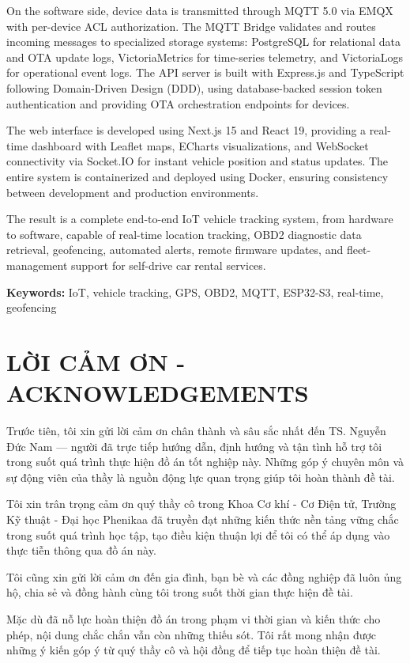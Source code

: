 \documentclass[a4paper]{extarticle}
\newcommand{\majorheading}[1]{%
  \clearpage
  \phantomsection
  \section*{#1}%
  \addcontentsline{toc}{section}{#1}%
}
\begin{document}
On the software side, device data is transmitted through MQTT 5.0 via
EMQX with per-device ACL authorization. The MQTT Bridge validates and
routes incoming messages to specialized storage systems: PostgreSQL for
relational data and OTA update logs, VictoriaMetrics for time-series
telemetry, and VictoriaLogs for operational event logs. The API server
is built with Express.js and TypeScript following Domain-Driven Design
(DDD), using database-backed session token authentication and providing
OTA orchestration endpoints for devices.

The web interface is developed using Next.js 15 and React 19, providing
a real-time dashboard with Leaflet maps, ECharts visualizations, and
WebSocket connectivity via Socket.IO for instant vehicle position and
status updates. The entire system is containerized and deployed using
Docker, ensuring consistency between development and production
environments.

The result is a complete end-to-end IoT vehicle tracking system, from
hardware to software, capable of real-time location tracking, OBD2
diagnostic data retrieval, geofencing, automated alerts, remote firmware
updates, and fleet-management support for self-drive car rental
services.

\textbf{Keywords:} IoT, vehicle tracking, GPS, OBD2, MQTT, ESP32-S3,
real-time, geofencing

\majorheading{LỜI CẢM ƠN - ACKNOWLEDGEMENTS}\label{lux1eddi-cux1ea3m-ux1a1n---acknowledgements}

Trước tiên, tôi xin gửi lời cảm ơn chân thành và sâu sắc nhất đến TS.
Nguyễn Đức Nam --- người đã trực tiếp hướng dẫn, định hướng và tận tình
hỗ trợ tôi trong suốt quá trình thực hiện đồ án tốt nghiệp này. Những
góp ý chuyên môn và sự động viên của thầy là nguồn động lực quan trọng
giúp tôi hoàn thành đề tài.

Tôi xin trân trọng cảm ơn quý thầy cô trong Khoa Cơ khí - Cơ Điện tử,
Trường Kỹ thuật - Đại học Phenikaa đã truyền đạt những kiến thức nền
tảng vững chắc trong suốt quá trình học tập, tạo điều kiện thuận lợi để
tôi có thể áp dụng vào thực tiễn thông qua đồ án này.

Tôi cũng xin gửi lời cảm ơn đến gia đình, bạn bè và các đồng nghiệp đã
luôn ủng hộ, chia sẻ và đồng hành cùng tôi trong suốt thời gian thực
hiện đề tài.

Mặc dù đã nỗ lực hoàn thiện đồ án trong phạm vi thời gian và kiến thức
cho phép, nội dung chắc chắn vẫn còn những thiếu sót. Tôi rất mong nhận
được những ý kiến góp ý từ quý thầy cô và hội đồng để tiếp tục hoàn
thiện đề tài.
\end{document}
